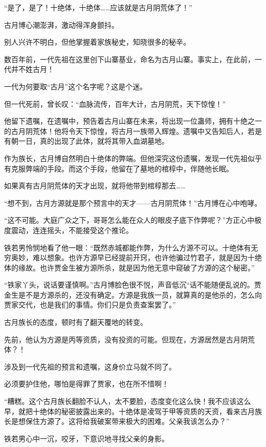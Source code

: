 \begin{this_body}
“是了，是了！十绝体，十绝体……应该就是古月阴荒体了！”

古月博心潮澎湃，激动得浑身颤抖。

别人兴许不明白，但他掌握着家族秘史，知晓很多的秘辛。

数百年前，一代先祖在这里创下山寨基业，命名为古月山寨。事实上，在此前，一代并不姓古月！

一代为何要取“古月”这个名字呢？这是个迷。

但一代死前，曾长叹：“血脉流传，百年大计，古月阴荒，天下惊惶！”

他留下遗嘱，在遗嘱中，预告着古月山寨在未来，将出现一位蛊师，拥有十绝之一的古月阴荒体！他将令天下惊惶，将古月一族带入辉煌。遗嘱中又告知后人，若是有朝一日，真的出现了此体，就将其带入血湖墓地。

作为族长，古月博自然明白十绝体的弊端。但他深究这份遗嘱，发现一代先祖似乎有克服弊端的手段。而这个手段，他留在了墓地的棺椁中，伴随他长眠。

如果真有古月阴荒体的天才出现，就将他带到棺椁那去……

“想不到，古月方源就是那个预言中的天才——古月阴荒体！”古月博在心中咆哮。

“这不可能。大庭广众之下，哥哥怎么能在众人的眼皮子底下作弊呢？”方正心中极度震动，连连摇头，不能接受这个推论。

铁若男怜悯地看了他一眼：“既然赤城都能作弊，为什么方源不可以。十绝体有无穷奥妙，难以想象。也许方源早已经提前开窍，也许他骗过竹君子，就是因为十绝体的缘故。也许贾金生被方源所杀，就是因为他无意中窥破了方源的这个秘密。”

“铁家丫头，说话要谨慎啊。”古月博脸色很不悦，声音低沉“话不能随便乱说的。贾金生是不是方源杀的，还没有确定。方源是我族一员，就算真的是他杀的，怎么向贾家交代，也是我们的事情。你们只是负责查案罢了。”

古月族长的态度，顿时有了翻天覆地的转变。

先前，他认为方源是丙等资质，没有投资的可能。但现在，方源居然是古月阴荒体？！

涉及到一代先祖的预言和遗嘱，这身价立马就不同了。

必须要护住他，哪怕是得罪了贾家，也在所不惜啊！

“糟糕。这个古月族长翻脸不认人，太不要脸，态度变化这么快！我不应该这么早，就把十绝体的秘密披露出来的。十绝体是凌驾于甲等资质的天资，看来古月族长是想保住方源了。这将给我破案带来极大的困难。父亲我该怎么办？”

铁若男心中一沉，咬牙，下意识地寻找父亲的身影。


\end{this_body}
